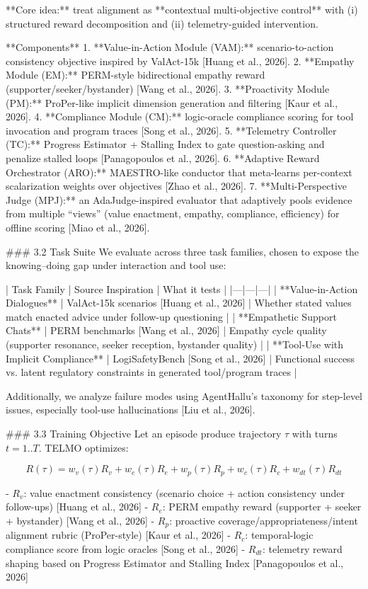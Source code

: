 **Core idea:** treat alignment as **contextual multi-objective control** with (i) structured reward decomposition and (ii) telemetry-guided intervention.

**Components**
1. **Value-in-Action Module (VAM):** scenario-to-action consistency objective inspired by ValAct-15k [Huang et al., 2026].  
2. **Empathy Module (EM):** PERM-style bidirectional empathy reward (supporter/seeker/bystander) [Wang et al., 2026].  
3. **Proactivity Module (PM):** ProPer-like implicit dimension generation and filtering [Kaur et al., 2026].  
4. **Compliance Module (CM):** logic-oracle compliance scoring for tool invocation and program traces [Song et al., 2026].  
5. **Telemetry Controller (TC):** Progress Estimator + Stalling Index to gate question-asking and penalize stalled loops [Panagopoulos et al., 2026].  
6. **Adaptive Reward Orchestrator (ARO):** MAESTRO-like conductor that meta-learns per-context scalarization weights over objectives [Zhao et al., 2026].  
7. **Multi-Perspective Judge (MPJ):** an AdaJudge-inspired evaluator that adaptively pools evidence from multiple “views” (value enactment, empathy, compliance, efficiency) for offline scoring [Miao et al., 2026].

### 3.2 Task Suite  
We evaluate across three task families, chosen to expose the knowing–doing gap under interaction and tool use:

| Task Family | Source Inspiration | What it tests |
|---|---|---|
| **Value-in-Action Dialogues** | ValAct-15k scenarios [Huang et al., 2026] | Whether stated values match enacted advice under follow-up questioning |
| **Empathetic Support Chats** | PERM benchmarks [Wang et al., 2026] | Empathy cycle quality (supporter resonance, seeker reception, bystander quality) |
| **Tool-Use with Implicit Compliance** | LogiSafetyBench [Song et al., 2026] | Functional success vs. latent regulatory constraints in generated tool/program traces |

Additionally, we analyze failure modes using AgentHallu’s taxonomy for step-level issues, especially tool-use hallucinations [Liu et al., 2026].

### 3.3 Training Objective  
Let an episode produce trajectory \( \tau \) with turns \(t=1..T\). TELMO optimizes:

\[
R(\tau)= w_v(\tau)R_v + w_e(\tau)R_e + w_p(\tau)R_p + w_c(\tau)R_c + w_{dt}(\tau)R_{dt}
\]

- \(R_v\): value enactment consistency (scenario choice + action consistency under follow-ups) [Huang et al., 2026]  
- \(R_e\): PERM empathy reward (supporter + seeker + bystander) [Wang et al., 2026]  
- \(R_p\): proactive coverage/appropriateness/intent alignment rubric (ProPer-style) [Kaur et al., 2026]  
- \(R_c\): temporal-logic compliance score from logic oracles [Song et al., 2026]  
- \(R_{dt}\): telemetry reward shaping based on Progress Estimator and Stalling Index [Panagopoulos et al., 2026]

